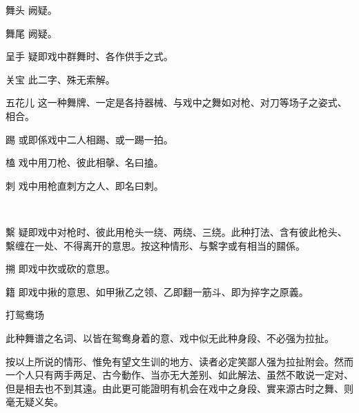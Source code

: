 \quad 舞头
\quad 
阙疑。

\quad 舞尾
\quad 
阙疑。 

\quad 呈手
\quad 
疑即戏中群舞时、各作供手之式。

\quad 关宝
\quad 
此二字、殊无索解。

\quad 五花儿
\quad 
这一种舞牌、一定是各持器械、与戏中之舞如对枪、对刀等场子之姿式、相合。

\quad 踢
\quad 
或即係戏中二人相踢、或一踢一拍。

\quad 榼
\quad 
戏中用刀枪、彼此相撀、名曰搕。

\quad 刺
\quad 
戏中用枪直刺方之人、即名曰刺。

\quad 𭣇
\quad 
戏中甲用枪刀、压住乙之枪刀、乙必用手极力𭣇之、此即名曰𭣇。再一人持枪、以持枪之手背、撀左手手心、亦名曰𭣇。此种𭣇法、皆用三次。

\quad 繫
\quad 
疑即戏中对枪时、彼此用枪头一绕、两绕、三绕。此种打法、含有彼此枪头、繫缠在一处、不得离开的意思。按这种情形、与繫字或有相当的𨶹係。

\quad 搠
\quad 
即戏中扻或砍的意思。

\quad 籍
\quad 
即戏中揪的意思、如甲揪乙之领、乙即翻一筋斗、即为捽字之原義。

\quad 打鸳鸯场
\quad 

此种舞谱之名词、以皆在鸳鸯身着的意、戏中似无此种身段、不必强为拉扯。

按以上所说的情形、惟免有望文生训的地方、读者必定笑鄙人强为拉扯附会。然而一个人只有两手两足、古今動作、当亦无大差别、如此解法、虽然不敢说一定对、但是相去也不到其遠。由此更可能證明有机会在戏中之身段、實来源古时之舞、则毫无疑义矣。
